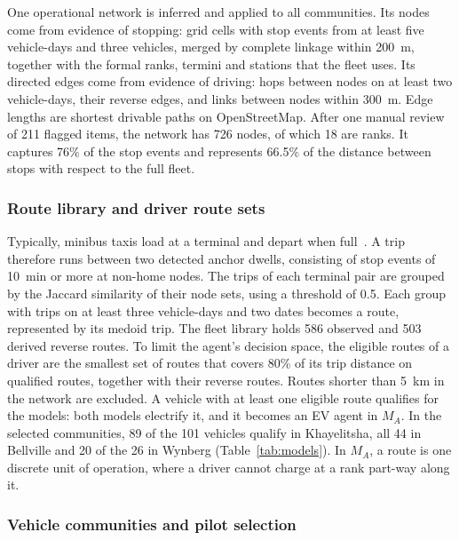 \documentclass{elsarticle}
\newcommand{\MA}{\ensuremath{M_A}}
\begin{document}
One operational network is inferred and applied to all communities. Its nodes come from evidence of stopping: grid cells with stop events from at least five vehicle-days and three vehicles, merged by complete linkage within 200~m, together with the formal ranks, termini and stations that the fleet uses. Its directed edges come from evidence of driving: hops between nodes on at least two vehicle-days, their reverse edges, and links between nodes within 300~m. Edge lengths are shortest drivable paths on OpenStreetMap. After one manual review of 211 flagged items, the network has 726 nodes, of which 18 are ranks. It captures 76\% of the stop events and represents 66.5\% of the distance between stops with respect to the full fleet. 

\subsubsection{Route library and driver route sets}
\label{sec:routes}
Typically, minibus taxis load at a terminal and depart when full~\cite{behrens2015_paratransit}. A trip therefore runs between two detected anchor dwells, consisting of stop events of 10~min or more at non-home nodes. The trips of each terminal pair are grouped by the Jaccard similarity of their node sets, using a threshold of 0.5. Each group with trips on at least three vehicle-days and two dates becomes a route, represented by its medoid trip. The fleet library holds 586 observed and 503 derived reverse routes. To limit the agent's decision space, the eligible routes of a driver are the smallest set of routes that covers 80\% of its trip distance on qualified routes, together with their reverse routes. Routes shorter than 5~km in the network are excluded. A vehicle with at least one eligible route qualifies for the models: both models electrify it, and it becomes an EV agent in \MA. In the selected communities, 89 of the 101 vehicles qualify in Khayelitsha, all 44 in Bellville and 20 of the 26 in Wynberg (Table~\ref{tab:models}). In \MA, a route is one discrete unit of operation, where a driver cannot charge at a rank part-way along it.

\subsubsection{Vehicle communities and pilot selection}
\label{sec:communities}
\end{document}
